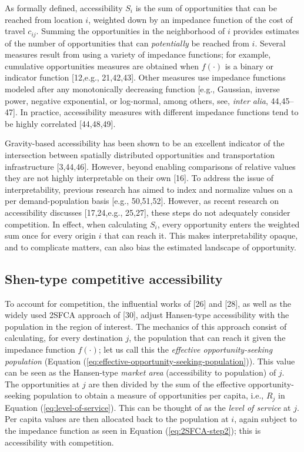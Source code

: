 \documentclass[10pt,letterpaper]{article}
\begin{document}
As formally defined, accessibility \(S_i\) is the sum of opportunities
that can be reached from location \(i\), weighted down by an impedance
function of the cost of travel \(c_{ij}\). Summing the opportunities in
the neighborhood of \(i\) provides estimates of the number of
opportunities that can \emph{potentially} be reached from \(i\). Several
measures result from using a variety of impedance functions; for
example, cumulative opportunities measures are obtained when
\(f(\cdot)\) is a binary or indicator function {[}12,e.g., 21,42,43{]}.
Other measures use impedance functions modeled after any monotonically
decreasing function {[}e.g., Gaussian, inverse power, negative
exponential, or log-normal, among others, see, \emph{inter alia},
44,45--47{]}. In practice, accessibility measures with different
impedance functions tend to be highly correlated {[}44,48,49{]}.

Gravity-based accessibility has been shown to be an excellent indicator
of the intersection between spatially distributed opportunities and
transportation infrastructure {[}3,44,46{]}. However, beyond enabling
comparisons of relative values they are not highly interpretable on
their own {[}16{]}. To address the issue of interpretability, previous
research has aimed to index and normalize values on a per
demand-population basis {[}e.g., 50,51,52{]}. However, as recent
research on accessibility discusses {[}17,24,e.g., 25,27{]}, these steps
do not adequately consider competition. In effect, when calculating
\(S_i\), every opportunity enters the weighted sum once for every origin
\(i\) that can reach it. This makes interpretability opaque, and to
complicate matters, can also bias the estimated landscape of
opportunity.

\hypertarget{shen-type-competitive-accessibility}{%
\subsection{Shen-type competitive
accessibility}\label{shen-type-competitive-accessibility}}

To account for competition, the influential works of {[}26{]} and
{[}28{]}, as well as the widely used 2SFCA approach of {[}30{]}, adjust
Hansen-type accessibility with the population in the region of interest.
The mechanics of this approach consist of calculating, for every
destination \(j\), the population that can reach it given the impedance
function \(f(\cdot)\); let us call this the \emph{effective
opportunity-seeking population} (Equation
(\ref{eq:effective-opportunity-seeking-population})). This value can be
seen as the Hansen-type \emph{market area} (accessibility to population)
of \(j\). The opportunities at \(j\) are then divided by the sum of the
effective opportunity-seeking population to obtain a measure of
opportunities per capita, i.e., \(R_j\) in Equation
(\ref{eq:level-of-service}). This can be thought of as the \emph{level
of service} at \(j\). Per capita values are then allocated back to the
population at \(i\), again subject to the impedance function as seen in
Equation (\ref{eq:2SFCA-step2}); this is accessibility with competition.
\end{document}

